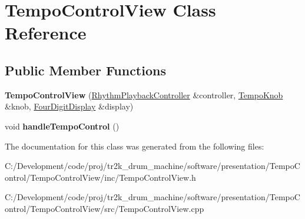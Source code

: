 \hypertarget{class_tempo_control_view}{}\section{Tempo\+Control\+View Class Reference}
\label{class_tempo_control_view}
\subsection*{Public Member Functions}
\begin{DoxyCompactItemize}
\item 
\mbox{\label{class_tempo_control_view_a7fa038833fdcbf54387da7722b963110}} 
{\bfseries Tempo\+Control\+View} (\mbox{\hyperlink{class_rhythm_playback_controller}{Rhythm\+Playback\+Controller}} \&controller, \mbox{\hyperlink{class_tempo_knob}{Tempo\+Knob}} \&knob, \mbox{\hyperlink{class_four_digit_display}{Four\+Digit\+Display}} \&display)
\item 
\mbox{\label{class_tempo_control_view_a878bf24175c64c6caea1e5ae037783cc}} 
void {\bfseries handle\+Tempo\+Control} ()
\end{DoxyCompactItemize}


The documentation for this class was generated from the following files\+:\begin{DoxyCompactItemize}
\item 
C\+:/\+Development/code/proj/tr2k\+\_\+drum\+\_\+machine/software/presentation/\+Tempo\+Control/\+Tempo\+Control\+View/inc/Tempo\+Control\+View.\+h\item 
C\+:/\+Development/code/proj/tr2k\+\_\+drum\+\_\+machine/software/presentation/\+Tempo\+Control/\+Tempo\+Control\+View/src/Tempo\+Control\+View.\+cpp\end{DoxyCompactItemize}
